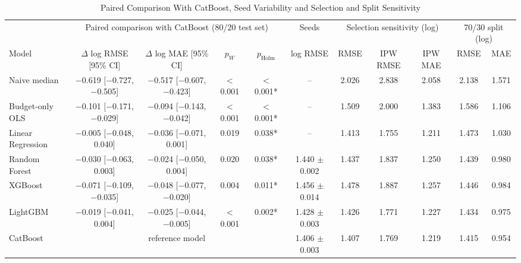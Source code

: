 \begin{table}[!t]
\centering
\caption{Paired Comparison With CatBoost, Seed Variability and Selection and Split Sensitivity}
\label{tab:uncertainty}
\scriptsize
\setlength{\tabcolsep}{3pt}
\begin{tabular}{@{}lcccccccccc@{}}
\toprule
 & \multicolumn{4}{c}{Paired comparison with CatBoost (80/20 test set)} & Seeds & \multicolumn{3}{c}{Selection sensitivity (log)} & \multicolumn{2}{c}{70/30 split (log)} \\
\cmidrule(lr){2-5}\cmidrule(lr){6-6}\cmidrule(lr){7-9}\cmidrule(lr){10-11}
Model & $\Delta$ log RMSE [95\% CI] & $\Delta$ log MAE [95\% CI] & $p_W$ & $p_{\mathrm{Holm}}$ & log RMSE & RMSE & IPW RMSE & IPW MAE & RMSE & MAE \\
\midrule
Naive median & $-$0.619 [$-$0.727, $-$0.505] & $-$0.517 [$-$0.607, $-$0.423] & $<$0.001 & $<$0.001* & -- & 2.026 & 2.838 & 2.058 & 2.138 & 1.571 \\
Budget-only OLS & $-$0.101 [$-$0.171, $-$0.029] & $-$0.094 [$-$0.143, $-$0.042] & $<$0.001 & $<$0.001* & -- & 1.509 & 2.000 & 1.383 & 1.586 & 1.106 \\
Linear Regression & $-$0.005 [$-$0.048, 0.040] & $-$0.036 [$-$0.071, 0.001] & 0.019 & 0.038* & -- & 1.413 & 1.755 & 1.211 & 1.473 & 1.030 \\
Random Forest & $-$0.030 [$-$0.063, 0.003] & $-$0.024 [$-$0.050, 0.004] & 0.020 & 0.038* & 1.440 $\pm$ 0.002 & 1.437 & 1.837 & 1.250 & 1.439 & 0.980 \\
XGBoost & $-$0.071 [$-$0.109, $-$0.035] & $-$0.048 [$-$0.077, $-$0.020] & 0.004 & 0.011* & 1.456 $\pm$ 0.014 & 1.478 & 1.887 & 1.257 & 1.446 & 0.984 \\
LightGBM & $-$0.019 [$-$0.041, 0.004] & $-$0.025 [$-$0.044, $-$0.005] & $<$0.001 & 0.002* & 1.428 $\pm$ 0.003 & 1.426 & 1.771 & 1.227 & 1.434 & 0.975 \\
CatBoost & \multicolumn{4}{c}{reference model} & 1.406 $\pm$ 0.003 & 1.407 & 1.769 & 1.219 & 1.415 & 0.954 \\
\bottomrule
\end{tabular}
\par{}
\end{table}
